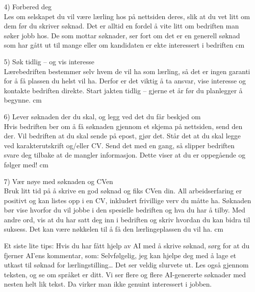 \documentclass[12pt,a4paper]{article}
\begin{document}
4) Forbered deg\\
Les om selskapet du vil være lærling hos på nettsiden deres, slik at du vet litt om dem før du skriver søknad. Det er alltid en fordel å vite litt om bedriften man søker jobb hos. De som mottar søknader, ser fort om det er en generell søknad som har gått ut til mange eller om kandidaten er ekte interessert i bedriften
 cm

5) Søk tidlig – og vis interesse\\
Lærebedriften bestemmer selv hvem de vil ha som lærling, så det er ingen garanti for å få plassen du helst vil ha. Derfor er det viktig å ta ansvar, vise interesse og kontakte bedriften direkte. Start jakten tidlig – gjerne et år før du planlegger å begynne.
 cm

6) Lever søknaden der du skal, og legg ved det du får beskjed om\\
Hvis bedriften ber om å få søknaden gjennom et skjema på nettsiden, send den der. Vil bedriften at du skal sende på epost, gjør det. Står det at du skal legge ved karakterutskrift og/eller CV. Send det med en gang, så slipper bedriften svare deg tilbake at de mangler informasjon. Dette viser at du er oppegående og følger med!
 cm

7) Vær nøye med søknaden og CVen\\
Bruk litt tid på å skrive en god søknad og fiks CVen din. All arbeidserfaring er positivt og kan listes opp i en CV, inkludert frivillige verv du måtte ha. Søknaden bør vise hvorfor du vil jobbe i den spesielle bedriften og hva du har å tilby. Med andre ord, vis at du har satt deg inn i bedriften og skriv hvordan du kan bidra til suksess. Det kan være nøkkelen til å få den lærlingeplassen du vil ha.
 cm


Et siste lite tips:
Hvis du har fått hjelp av AI med å skrive søknad, sørg for at du fjerner AI’ens kommentar, som: Selvfølgelig, jeg kan hjelpe deg med å lage et utkast til søknad for lærlingstilling… Det ser veldig slurvete ut. Les også gjennom teksten, og se om språket er ditt. Vi ser flere og flere AI-genererte søknader med nesten helt lik tekst. Da virker man ikke genuint interessert i jobben.


\vskip 10pt


\vfil

\eject


\end{document}
